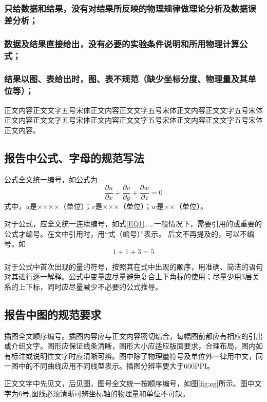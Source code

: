 \documentclass{thuemp}
\begin{document}
\subsubsection{只给数据和结果，没有对结果所反映的物理规律做理论分析及数据误差分析；}
\subsubsection{数据及结果直接给出，没有必要的实验条件说明和所用物理计算公式；}
\subsubsection{结果以图、表给出时，图、表不规范（缺少坐标分度、物理量及其单位等）；}
正文内容正文文字五号宋体正文内容正文文字五号宋体正文内容正文文字五号宋体正文内容正文文字五号宋体正文内容正文文字五号宋体正文内容正文文字五号宋体正文内容。
\subsection{报告中公式、字母的规范写法}
公式全文统一编号，如公式为
\begin{equation}\label{EQ1}
\frac{\partial u}{\partial x}+\frac{\partial v}{\partial y}+\frac{\partial w}{\partial z}=0
\end{equation}
式中，$u$是××××（单位）；$v$是×××（单位）；$w$是××（单位）。

对于公式，应全文统一连续编号，如式\eqref{EQ1}……一般情况下，需要引用的或重要的公式才编号。在文中引用时，用“式（编号）”表示。
后文不再提及的，可以不编号。如
\begin{equation*}
1 + 1 + 3 = 5
\end{equation*}

对于公式中首次出现的量的符号，按照其在式中出现的顺序，用准确、简洁的语句对其进行逐一解释。公式中变量应尽量避免复合上下角标的使用；尽量少用3层关系的上下标，同时应尽量减少不必要的公式推导。

\subsection{报告中图的规范要求}
插图全文顺序编号。插图内容应与正文内容密切结合，每幅图前都应有相应的引出或介绍文字。图形应保证线条清晰，图形大小应适应版面要求，合理布局，图内如有标注或说明性文字时应清晰可辨。图中除了物理量符号及单位外一律用中文，同一图中的不同曲线应用不同线型表示。插图分辨率要大于600PPI。

正文文字中先见文，后见图，图号全文统一按顺序编号，如图\ref{fig:eg}所示。图中文字为6号,图线必须清晰可辨坐标轴的物理量和单位不可缺。
\end{document}
